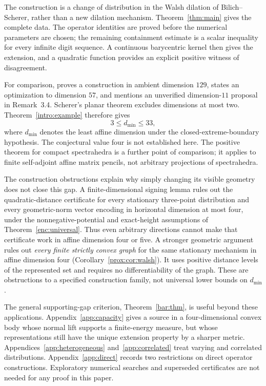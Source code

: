 \documentclass[11pt,letterpaper]{amsart}
\theoremstyle{definition}
\theoremstyle{remark}
\numberwithin{equation}{section}
\begin{document}
The construction is a change of distribution in the Walsh dilation of
Bilich--Scherer, rather than a new dilation mechanism. Theorem~\ref{thm:main}
gives the complete data. The operator identities are proved before the
numerical parameters are chosen; the remaining containment estimate
is a scalar inequality for every infinite digit sequence. A continuous
barycentric kernel then gives the extension, and a quadratic function
provides an explicit positive witness of disagreement.

For comparison, \cite[Corollary 3.3]{BS} proves a construction in
ambient dimension $129$, states an optimization to dimension $57$, and
mentions an unverified dimension-$11$ proposal in Remark~3.4.
Scherer's planar theorem \cite[Theorem 3.8]{planar} excludes dimensions
at most two. Theorem~\ref{intro:example} therefore gives
\begin{equation}\label{eq:dimension-range}
                            3\le d_{\min}\le33,
\end{equation}
where $d_{\min}$ denotes the least affine dimension under the
closed-extreme-boundary hypothesis. The conjectural value four is not
established here. The positive theorem for compact spectrahedra
\cite[Theorem 3.7]{spectra} is a further point of comparison; it applies
to finite self-adjoint affine matrix pencils, not arbitrary projections
of spectrahedra.

The construction obstructions explain why simply changing its visible
geometry does not close this gap. A finite-dimensional signing lemma
rules out the quadratic-distance certificate for every stationary
three-point distribution and every geometric-norm vector encoding in
horizontal dimension at most four, under the nonnegative-potential and
exact-height assumptions of Theorem~\ref{enc:universal}. Thus even arbitrary directions cannot
make that certificate work in affine dimension four or five.
A stronger geometric argument rules out \emph{every finite strictly
convex graph} for the same stationary mechanism in affine dimension
four (Corollary~\ref{prox:cor:walsh}). It uses positive distance levels
of the represented set and requires no differentiability of the graph.
These are obstructions to a specified construction family, not universal
lower bounds on $d_{\min}$.

The general supporting-gap criterion, Theorem~\ref{bar:thm}, is useful
beyond these applications. Appendix~\ref{app:capacity} gives a
source in a four-dimensional convex body whose normal lift supports a
finite-energy measure, but whose representations still have the unique extension
property by a sharper metric. Appendices~\ref{app:heterogeneous}
and~\ref{app:correlated} treat varying and correlated distributions.
Appendix~\ref{app:direct} records two restrictions on direct operator
constructions. Exploratory numerical searches and superseded
certificates are not needed for any proof in this paper.
\end{document}
